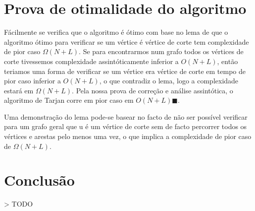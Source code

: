 \documentclass{scrartcl}
\begin{document}
\section*{Prova de otimalidade do algoritmo}
Fácilmente se verifica que o algoritmo é ótimo com base no lema de que o algoritmo ótimo para verificar se um vértice é vértice de corte tem complexidade de pior caso $\Omega(N+L)$. Se para encontrarmos num grafo todos os vértices de corte tivessemos complexidade assintóticamente inferior a $O(N+L)$, então teriamos uma forma de verificar se um vértice era vértice de corte em tempo de pior caso inferior a $O(N+L)$, o que contradiz o lema, logo a complexidade estará em $\Omega (N+L)$. Pela nossa prova de correção e análise assintótica, o algoritmo de Tarjan corre em pior caso em $ O(N+L) \blacksquare$. 

Uma demonstração do lema pode-se basear no facto de não ser possível verificar para um grafo geral que u é um vértice de corte sem de facto percorrer todos os vértices e arestas pelo menos uma vez, o que implica a complexidade de pior caso de  $\Omega (N+L)$.


\section*{Conclusão}
> TODO


\end{document}
